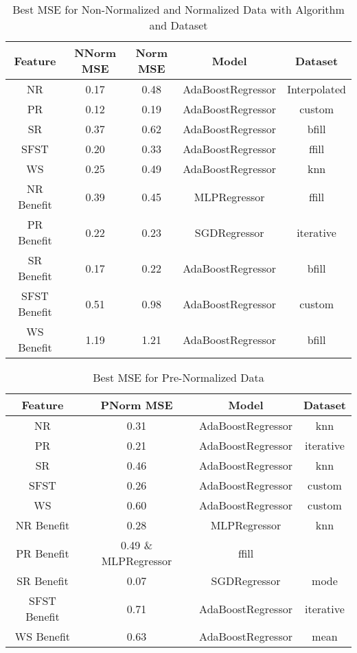 \begin{table}[H]
\centering
\begin{tabular}{|c|c|c|c|c|}
\hline
\textbf{Feature} & \textbf{NNorm MSE} & \textbf{Norm MSE} & \textbf{Model} & \textbf{Dataset} \\
\hline
NR & 0.17 & 0.48 & AdaBoostRegressor & Interpolated \\
\hline
PR & 0.12 & 0.19 & AdaBoostRegressor & custom \\
\hline
SR & 0.37 & 0.62 & AdaBoostRegressor & bfill \\
\hline
SFST & 0.20 & 0.33 & AdaBoostRegressor & ffill \\
\hline
WS & 0.25 & 0.49 & AdaBoostRegressor & knn \\
\hline
NR Benefit & 0.39 & 0.45 & MLPRegressor & ffill \\
\hline
PR Benefit & 0.22 & 0.23 & SGDRegressor & iterative \\
\hline
SR Benefit & 0.17 & 0.22 & AdaBoostRegressor & bfill \\
\hline
SFST Benefit & 0.51 & 0.98 & AdaBoostRegressor & custom \\
\hline
WS Benefit & 1.19 & 1.21 & AdaBoostRegressor & bfill \\
\hline
\end{tabular}
\caption{Best MSE for Non-Normalized and Normalized Data with Algorithm and Dataset}
\label{reg_all_tab:norm_mse}
\end{table}


\begin{table}[H]
\centering
\begin{tabular}{|c|c|c|c|}
\hline
\textbf{Feature} & \textbf{PNorm MSE} & \textbf{Model} & \textbf{Dataset}  \\
\hline
NR & 0.31& AdaBoostRegressor & knn  \\
\hline
PR  & 0.21 & AdaBoostRegressor & iterative\\
\hline
SR & 0.46 & AdaBoostRegressor & knn \\
\hline
SFST & 0.26& AdaBoostRegressor & custom  \\
\hline
WS & 0.60 & AdaBoostRegressor & custom \\
\hline
NR Benefit & 0.28& MLPRegressor & knn  \\
\hline
PR Benefit  & 0.49 \& MLPRegressor & ffill \\
\hline
SR Benefit & 0.07& SGDRegressor & mode  \\
\hline
SFST Benefit & 0.71& AdaBoostRegressor & iterative  \\
\hline
WS Benefit & 0.63& AdaBoostRegressor & mean  \\
\hline
\end{tabular}
\caption{Best MSE for Pre-Normalized Data}
\label{reg_all_tab:pre_norm_mse}
\end{table}
